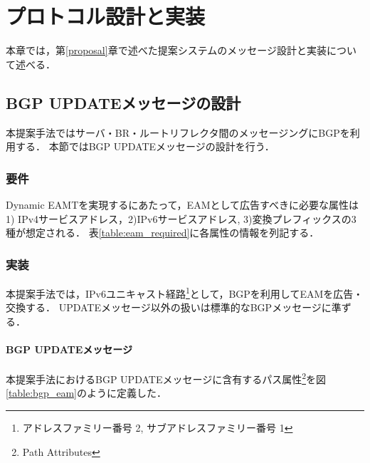\chapter{プロトコル設計と実装}
\label{implementation}
本章では，第\ref{proposal}章で述べた提案システムのメッセージ設計と実装について述べる．

\section{BGP UPDATEメッセージの設計}
本提案手法ではサーバ・BR・ルートリフレクタ間のメッセージングにBGPを利用する．
本節ではBGP UPDATEメッセージの設計を行う．
\subsection{要件}
Dynamic EAMTを実現するにあたって，EAMとして広告すべきに必要な属性は1) IPv4サービスアドレス，2)IPv6サービスアドレス, 3)変換プレフィックスの3種が想定される．
表\ref{table:eam_required}に各属性の情報を列記する．

\begin{table}[h]
    \label{table:eam_required}
    \caption{EAMに必要な情報}
\end{table}

\subsection{実装}
本提案手法では，IPv6ユニキャスト経路\footnote{アドレスファミリー番号 2, サブアドレスファミリー番号 1\cite{IANA_AFI,IANA_SAFI}}として，BGPを利用してEAMを広告・交換する．
UPDATEメッセージ以外の扱いは標準的なBGPメッセージに準ずる．

\subsubsection{BGP UPDATEメッセージ}
本提案手法におけるBGP UPDATEメッセージに含有するパス属性\footnote{Path Attributes}を図\ref{table:bgp_eam}のように定義した．


